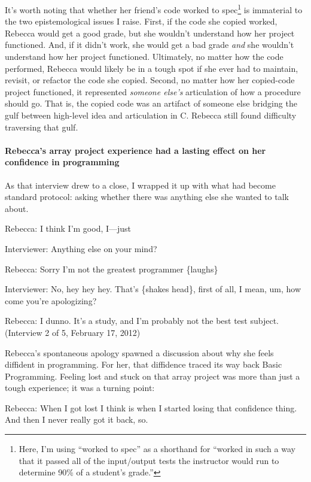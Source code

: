 It's worth noting that whether her friend's code worked to
spec\footnote{Here, I'm using ``worked to spec'' as a shorthand for
  ``worked in such a way that it passed all of the input/output tests
  the instructor would run to determine 90\% of a student's grade.''} is
immaterial to the two epistemological issues I raise. First, if the code
she copied worked, Rebecca would get a good grade, but she wouldn't
understand how her project functioned. And, if it didn't work, she would
get a bad grade \emph{and} she wouldn't understand how her project
functioned. Ultimately, no matter how the code performed, Rebecca would
likely be in a tough spot if she ever had to maintain, revisit, or
refactor the code she copied. Second, no matter how her copied-code
project functioned, it represented \emph{someone else's} articulation of
how a procedure should go. That is, the copied code was an artifact of
someone else bridging the gulf between high-level idea and articulation
in C. Rebecca still found difficulty traversing that gulf.

\paragraph{Rebecca's array project experience had a lasting effect on
her confidence in
programming}\label{rebeccas-array-project-experience-had-a-lasting-effect-on-her-confidence-in-programming}

As that interview drew to a close, I wrapped it up with what had become
standard protocol: asking whether there was anything else she wanted to
talk about.

Rebecca: I think I'm good, I---just

Interviewer: Anything else on your mind?

Rebecca: Sorry I'm not the greatest programmer \{laughs\}

Interviewer: No, hey hey hey. That's \{shakes head\}, first of all, I
mean, um, how come you're apologizing?

Rebecca: I dunno. It's a study, and I'm probably not the best test
subject. (Interview 2 of 5, February 17, 2012)

Rebecca's spontaneous apology spawned a discussion about why she feels
diffident in programming. For her, that diffidence traced its way back
Basic Programming. Feeling lost and stuck on that array project was more
than just a tough experience; it was a turning point:

Rebecca: When I got lost I think is when I started losing that
confidence thing. And then I never really got it back, so.

